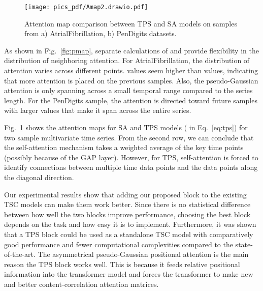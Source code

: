 \documentclass[journal]{IEEEtran}
\begin{document}
\begin{figure}[!t]
\centering
\texttt{[image: pics\_pdf/Amap2.drawio.pdf]}
\caption{Attention map comparison between TPS and SA models on samples from a) AtrialFibrillation, b) PenDigits datasets.}
\label{fig:amap}
\end{figure}
As shown in Fig.~\ref{fig:pmap}, separate calculations of  and  provide flexibility in the distribution of neighboring attention. For AtrialFibrillation, the distribution of attention varies across different points.  values seem higher than  values, indicating that more attention is placed on the previous samples. Also, the pseudo-Gaussian attention is only spanning across a small temporal range compared to the series length. For the PenDigits sample, the attention is directed toward future samples with larger  values that make it span across the entire series.

Fig.~\ref{fig:amap} shows the attention maps for SA and TPS models ( in Eq.~\eqref{eq:tps}) for two sample multivariate time series. From the second row, we can conclude that the self-attention mechanism takes a weighted average of the key time points (possibly because of the GAP layer). However, for TPS, self-attention is forced to identify connections between multiple time data points and the data points along the diagonal direction. 

Our experimental results show that adding our proposed block to the existing TSC models can make them work better. Since there is no statistical difference between how well the two blocks improve performance, choosing the best block depends on the task and how easy it is to implement. Furthermore, it was shown that a TPS block could be used as a standalone TSC model with comparatively good performance and fewer computational complexities compared to the state-of-the-art. The asymmetrical pseudo-Gaussian positional attention is the main reason the TPS block works well. This is because it feeds relative positional information into the transformer model and forces the transformer to make new and better content-correlation attention matrices.
\end{document}
